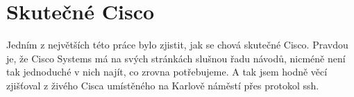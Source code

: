 \section{Skutečné Cisco}
Jedním z největších  této práce bylo zjistit, jak se chová skutečné Cisco. Pravdou je, že Cisco Systems má na svých stránkách slušnou řadu návodů, nicméně není tak jednoduché v nich najít, co zrovna potřebujeme. A tak jsem hodně věcí zjišťoval z živého Cisca umístěného na Karlově náměstí přes protokol ssh. 








